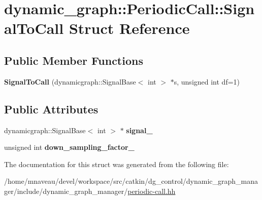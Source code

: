 \hypertarget{structdynamic__graph_1_1PeriodicCall_1_1SignalToCall}{}\section{dynamic\+\_\+graph\+:\+:Periodic\+Call\+:\+:Signal\+To\+Call Struct Reference}
\label{structdynamic__graph_1_1PeriodicCall_1_1SignalToCall}
\subsection*{Public Member Functions}
\begin{DoxyCompactItemize}
\item 
{\bfseries Signal\+To\+Call} (dynamicgraph\+::\+Signal\+Base$<$ int $>$ $\ast$s, unsigned int df=1)\hypertarget{structdynamic__graph_1_1PeriodicCall_1_1SignalToCall_a9efbb8370bdb3ebadb9ee9e8f4a6c209}{}\label{structdynamic__graph_1_1PeriodicCall_1_1SignalToCall_a9efbb8370bdb3ebadb9ee9e8f4a6c209}

\end{DoxyCompactItemize}
\subsection*{Public Attributes}
\begin{DoxyCompactItemize}
\item 
dynamicgraph\+::\+Signal\+Base$<$ int $>$ $\ast$ {\bfseries signal\+\_\+}\hypertarget{structdynamic__graph_1_1PeriodicCall_1_1SignalToCall_aa4ca46512452a1107926da8a92803597}{}\label{structdynamic__graph_1_1PeriodicCall_1_1SignalToCall_aa4ca46512452a1107926da8a92803597}

\item 
unsigned int {\bfseries down\+\_\+sampling\+\_\+factor\+\_\+}\hypertarget{structdynamic__graph_1_1PeriodicCall_1_1SignalToCall_aae29661d7a6753e2bd60565ce2a7d146}{}\label{structdynamic__graph_1_1PeriodicCall_1_1SignalToCall_aae29661d7a6753e2bd60565ce2a7d146}

\end{DoxyCompactItemize}


The documentation for this struct was generated from the following file\+:\begin{DoxyCompactItemize}
\item 
/home/mnaveau/devel/workspace/src/catkin/dg\+\_\+control/dynamic\+\_\+graph\+\_\+manager/include/dynamic\+\_\+graph\+\_\+manager/\hyperlink{periodic-call_8hh}{periodic-\/call.\+hh}\end{DoxyCompactItemize}
